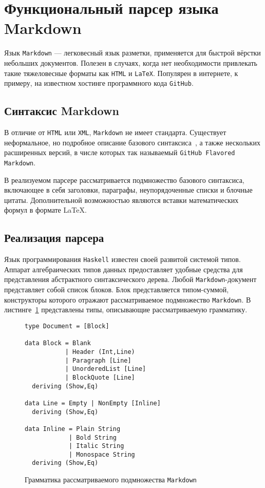 \newpage

\section{Функциональный парсер языка Markdown}

Язык \lstinline{Markdown} --- легковесный язык разметки, применяется для быстрой вёрстки небольших документов. Полезен в случаях, когда нет необходимости привлекать такие тяжеловесные форматы как \lstinline{HTML} и \lstinline{LaTeX}. Популярен в интернете, к примеру, на известном хостинге программного кода \lstinline{GitHub}.

\subsection{Синтаксис Markdown}

В отличие от \lstinline{HTML} или \lstinline{XML}, \lstinline{Markdown} не имеет стандарта. Существует неформальное, но подробное описание базового синтаксиса~\autocite{MarkdownSyntax}, а также нескольких расширенных версий, в числе которых так называемый \lstinline{GitHub Flavored Markdown}.

В реализуемом парсере рассматривается подмножество базового синтаксиса, включающее в себя заголовки, параграфы, неупорядоченные списки и блочные цитаты. Дополнительной возможностью являются вставки математических формул в формате \LaTeX.  

\subsection{Реализация парсера}  

Язык программирования \lstinline{Haskell} известен своей развитой системой типов. Аппарат алгебраических типов данных предоставляет удобные средства для представления абстрактного синтаксического дерева. Любой \lstinline{Markdown}-документ представляет собой список блоков. Блок представляется типом-суммой, конструкторы которого отражают рассматриваемое подмножество \lstinline{Markdown}. В листинге~\ref{listing:MarkdownADT} представлены типы, описывающие рассматриваемую грамматику.

\begin{figure}[t]
\begin{lstlisting}
type Document = [Block]

data Block = Blank
           | Header (Int,Line)
           | Paragraph [Line]
           | UnorderedList [Line]
           | BlockQuote [Line]
  deriving (Show,Eq)

data Line = Empty | NonEmpty [Inline]
  deriving (Show,Eq)

data Inline = Plain String
            | Bold String
            | Italic String
            | Monospace String
  deriving (Show,Eq) 
\end{lstlisting}
\caption{Грамматика рассматриваемого подмножества \lstinline{Markdown}}
\label{listing:MarkdownADT}
\end{figure}

